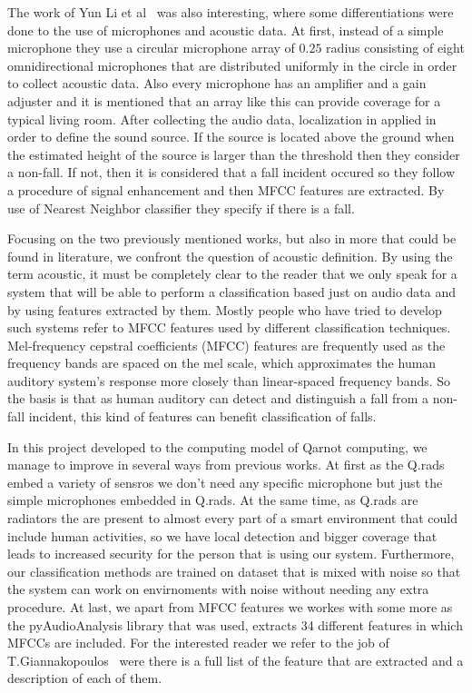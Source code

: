 \documentclass[10pt, conference, compsocconf]{IEEEtran}
\begin{document}
The work of Yun Li et al~\cite{Yun2012} was also interesting, where some differentiations were done to the use of microphones and acoustic data. At first, instead of a simple microphone they use a circular microphone array of $0.25$ radius consisting of eight omnidirectional microphones that are distributed uniformly in the circle in order to collect acoustic data. Also every microphone has an amplifier and a gain adjuster and it is mentioned that an array like this can provide coverage for a typical living room. After collecting the audio data, localization in applied in order to define the sound source. If the source is located above the ground when the estimated height of the source is larger than the threshold then they consider a non-fall. If not, then it is considered that a fall incident occured so they follow a procedure of signal enhancement and then MFCC features are extracted. By use of Nearest Neighbor classifier they specify if there is a fall. 

Focusing on the two previously mentioned works, but also in more that could be found in literature, we confront the question of acoustic definition. By using the term acoustic, it must be completely clear to the reader that we only speak for a system that will be able to perform a classification based just on audio data and by using features extracted by them. Mostly people who have tried to develop such systems refer to MFCC features used by different classification techniques. Mel-frequency cepstral coefficients (MFCC) features are frequently used as the frequency bands are spaced on the mel scale, which approximates the human auditory system's response more closely than linear-spaced frequency bands. So the basis is that as human auditory can detect and distinguish a fall from a non-fall incident, this kind of features can benefit classification of falls. 

In this project developed to the computing model of Qarnot computing, we manage to improve in several ways from previous works. At first as the Q.rads embed a variety of sensros we don't need any specific microphone but just the simple microphones embedded in Q.rads. At the same time, as Q.rads are radiators the are present to almost every part of a smart environment that could include human activities, so we have local detection and bigger coverage that leads to increased security for the person that is using our system. Furthermore, our classification methods are trained on dataset that is mixed with noise so that the system can work on envirnoments with noise without needing any extra procedure. At last, we apart from MFCC features we workes with some more as the pyAudioAnalysis library that was used, extracts 34 different features in which MFCCs are included. For the interested reader we refer to the job of T.Giannakopoulos~\cite{giannakopoulos2015pyaudioanalysis} were there is a full list of the feature that are extracted and a description of each of them.         
 
\end{document}
